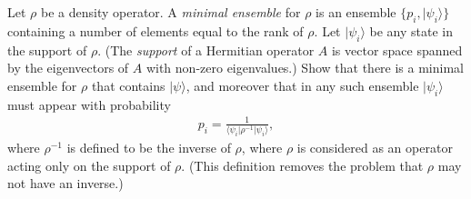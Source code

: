 \documentclass[en]{sol-man}
\begin{document}
\begin{exe}
    Let $\rho$ be a density operator. A \emph{minimal ensemble} for $\rho$ is an ensemble $\{p_i,\lvert\psi_i\rangle\}$ containing a number of elements equal to the rank of $\rho$. Let $\lvert\psi_i\rangle$ be any state in the support of $\rho$. (The \emph{support} of a Hermitian operator $A$ is vector space spanned by the eigenvectors of $A$ with non-zero eigenvalues.) Show that there is a minimal ensemble for $\rho$ that contains $\lvert\psi\rangle$, and moreover that in any such ensemble $\lvert\psi_i\rangle$ must appear with probability
    \begin{align}
        p_i=\frac{1}{\langle\psi_i\rvert\rho^{-1}\lvert\psi_i\rangle},
    \end{align}
    where $\rho^{-1}$ is defined to be the inverse of $\rho$, where $\rho$ is considered as an operator acting only on the support of $\rho$. (This definition removes the problem that $\rho$ may not have an inverse.)
\end{exe}
\end{document}

